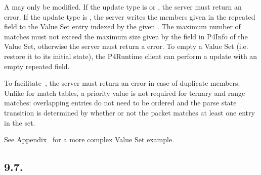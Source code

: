 \documentclass[11pt]{article}
\begin{document}
{%
\noindent{}A  may only be modified. If the update type is  or
, the server must return an  error. If the update type
is , the server writes the members given in the repeated field to the
Value Set entry indexed by the given . The maximum number of
matches must not exceed the maximum size given by the  field in P4Info of
the Value Set, otherwise the server must return a  error. To
empty a Value Set (i.e. restore it to its initial state), the P4Runtime client
can perform a  update with an empty  repeated field.%

To facilitate~, the server must
return an  error in case of duplicate members. Unlike for match
tables, a priority value is not required for ternary and range matches:
overlapping entries do not need to be ordered and the parse state transition
is determined by whether or not the packet matches at least one entry in the
set.%

See Appendix~ for a more complex Value Set example.%

\subsection{9.7.\hspace*{0.5em}}\label{sec-registerentry}%

}
\end{document}
